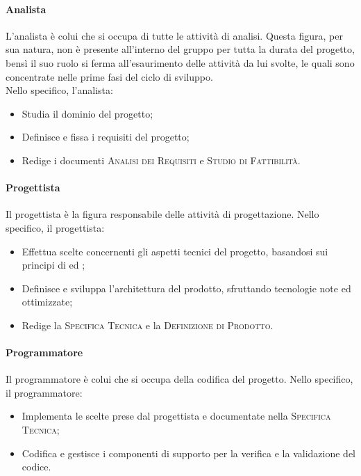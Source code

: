 \documentclass[../norme-di-progetto.tex]{subfiles}
\begin{document}
\paragraph{Analista}
L'analista è colui che si occupa di tutte le attività di analisi. Questa figura, per sua natura, non è presente all'interno del gruppo per tutta la durata del progetto, bensì il suo ruolo si ferma all'esaurimento delle attività da lui svolte, le quali sono concentrate nelle prime fasi del ciclo di sviluppo. \\
Nello specifico, l'analista:
\begin{itemize}
  \item Studia il dominio del progetto;
  \item Definisce e fissa i requisiti del progetto;
  \item Redige i documenti \textsc{Analisi dei Requisiti} e \textsc{Studio di Fattibilità}.
\end{itemize}

\paragraph{Progettista}
Il progettista è la figura responsabile delle attività di progettazione. Nello specifico, il progettista:
\begin{itemize}
  \item Effettua scelte concernenti gli aspetti tecnici del progetto, basandosi sui principi di  ed ;
  \item Definisce e sviluppa l'architettura del prodotto, sfruttando tecnologie note ed ottimizzate;
  \item Redige la \textsc{Specifica Tecnica} e la \textsc{Definizione di Prodotto}.
\end{itemize}

\paragraph{Programmatore}
Il programmatore è colui che si occupa della codifica del progetto. Nello specifico, il programmatore:
\begin{itemize}
  \item Implementa le scelte prese dal progettista e documentate nella \textsc{Specifica Tecnica};
  \item Codifica e gestisce i componenti di supporto per la verifica e la validazione del codice.
\end{itemize}
\end{document}
